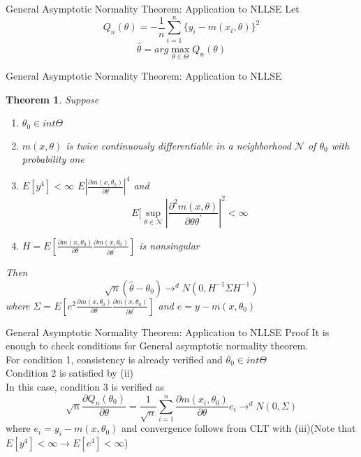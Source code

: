 \documentclass{beamer}
\newtheorem{thm}{Theorem}[subsection]
\begin{document}
\begin{frame}{General Asymptotic Normality Theorem: Application to NLLSE}
	Let 
	\[Q_n(\theta) = -\frac{1}{n} \sum^n_{i=1} \{y_i - m(x_i,\theta)\}^2\]
	\[\hat{\theta} = arg \max_{\theta \in \Theta} Q_n(\theta)\]
\end{frame}
\begin{frame}{General Asymptotic Normality Theorem: Application to NLLSE}
\begin{thm}
	Suppose
	\begin{enumerate}
			\item $\theta_0 \in int \Theta$
			\item $m(x,\theta)$ is twice continuously differentiable in a neighborhood $\mathcal{N}$ of $\theta_0$ with probability one
			\item $E[y^4] < \infty$ $E|\frac{\partial m(x,\theta_0)}{\partial \theta}|^4$ and 
				\[E[\sup_{\theta \in \mathcal{N}} | \frac{\partial^2 m(x,\theta)}{\partial \theta \theta^{'}}|^2 < \infty\]
				\item $H = E[\frac{\partial m(x,\theta_0)}{\partial \theta} \frac{\partial m(x,\theta_0)}{\partial \theta^{'}}]$ is nonsingular
	\end{enumerate}
	Then 
	\[\sqrt{n}(\hat{\theta} - \theta_0) \rightarrow^d N(0, H^{-1} \Sigma H^{-1})\]
	where $\Sigma = E[e^2 \frac{\partial m(x,\theta_0)}{\partial \theta} \frac{\partial m(x,\theta_0)}{\partial \theta^{'}}]$ and $e = y - m(x,\theta_0)$
\end{thm}
\end{frame}
\begin{frame}{General Asymptotic Normality Theorem: Application to NLLSE Proof}
	It is enough to check conditions for General asymptotic normality theorem. \\
	For condition 1, consistency is already verified and $\theta_0 \in int\Theta$\\
	Condition 2 is satisfied by (ii) \\
	In this case, condition 3 is verified as 
	\[\sqrt{n} \frac{\partial Q_n(\theta_0)}{\partial \theta} = \frac{1}{\sqrt{n}} \sum^n_{i=1} \frac{\partial m(x_i,\theta_0)}{\partial \theta} e_i \rightarrow^d N(0,\Sigma)\]
	where $e_i = y_i - m(x,\theta_0)$ and convergence follows from CLT with (iii)(Note that $E[y^4] <\infty \rightarrow E[e^4] < \infty$)
\end{frame} 
\end{document}
